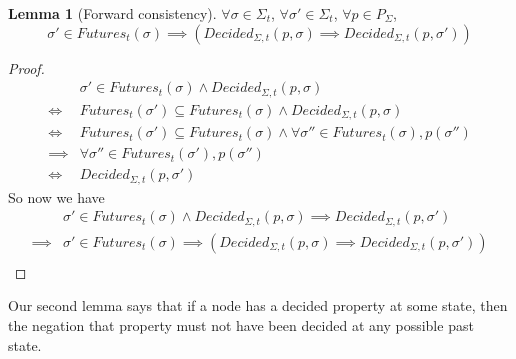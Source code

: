 \documentclass{article}
\theoremstyle{definition}
\newtheorem{lemma}{Lemma}
\begin{document}
\begin{lemma}[Forward consistency]
\label{lem:forw_safe} $\forall \sigma \in \Sigma_t$, $\forall \sigma' \in \Sigma_t$, $\forall p \in P_\Sigma$,
$$
\sigma' \in Futures_t(\sigma) \implies (Decided_{\Sigma, t}(p,\sigma) \implies Decided_{\Sigma, t}(p,\sigma'))
$$
\end{lemma}

\begin{proof}
\begin{align}
&\sigma' \in Futures_t(\sigma) \land Decided_{\Sigma, t}(p,\sigma) \\
\iff & Futures_t(\sigma') \subseteq Futures_t(\sigma) \land Decided_{\Sigma, t}(p,\sigma) \\
\iff & Futures_t(\sigma') \subseteq Futures_t(\sigma) \land \forall \sigma'' \in Futures_t(\sigma), p(\sigma'') \\
\implies &\forall \sigma'' \in Futures_t(\sigma'), p(\sigma'')\\
\iff &Decided_{\Sigma, t}(p, \sigma')
\end{align}
So now we have
\begin{align}
&\sigma' \in Futures_t(\sigma) \land Decided_{\Sigma, t}(p,\sigma) \implies Decided_{\Sigma, t}(p, \sigma')\\
\implies &\sigma' \in Futures_t(\sigma) \implies (Decided_{\Sigma, t}(p,\sigma) \implies Decided_{\Sigma, t}(p, \sigma'))\\
\end{align}
\end{proof}


\iffalse
\begin{lemma}[Current consistency]
$\forall p \in P_\Sigma$,
$$
Decided_{\Sigma, t}(p,\sigma) \implies \neg Decided_{\Sigma, t}(\neg p, \sigma)
$$
\end{lemma}

\begin{proof}
\begin{align}
Decided_{\Sigma, t}(p,\sigma) &\implies \forall \sigma' \in Futures_t(\sigma), p(\sigma')\\
&\implies \exists \sigma' \in Futures_t(\sigma), p(\sigma')\\
&\implies \neg \forall \sigma' \in Futures_t(\sigma), \neg p(\sigma')\\
&\implies \neg Decided_{\Sigma, t}(\neg p, \sigma)
\end{align}
\end{proof}
\fi

Our second lemma says that if a node has a decided property at some state, then the negation that property must not have been decided at any possible past state.
\end{document}
